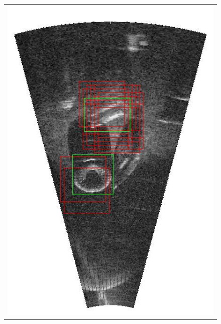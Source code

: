 \begin{figure}[p]
{\begin{tabular}[b]{c}
		\includegraphics[height=0.22\textheight]{chapters/images/proposals/detections/fcn-nms070-2016-02-11_070611-frame04292-proposals.jpg}

\end{tabular}}
\end{figure}
